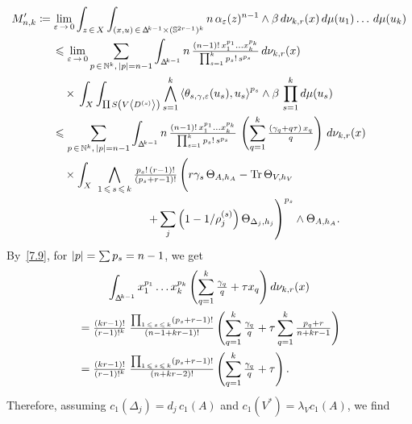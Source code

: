 \documentclass[AHL,Unicode,longabstracts,published]{cedram}
\DeclareMathOperator{\Tr}{Tr}
\DeclarePairedDelimiter{\abs}{\lvert}{\rvert}
\newcommand*\bN{\mathbb{N}}
\newcommand*\bS{\mathbb{S}}
\newcommand\bDel{\mbox{$\Delta$\newline \scalebox{.6}{\raisebox{3pt}{$\mkern-22mu\not{}\mkern12mu$}}}}
\newcommand\bDelta{\mathchoice{\bDel}{\bDel}{\scalebox{.7}{\bDel}}{\scalebox{.5}{\bDel}}}
\let\leq\leqslant
\newcommand*\bydef{\coloneqq}
\begin{document}
\break
\begin{multline*}
M'_{n,k} \bydef
\lim_{\varepsilon\,\to\,0}\int_{z\,\in\,X}
\int_{(x,u)\,\in\,\bDelta^{k-1}\times(\bS^{2r-1})^k} n\,\alpha_\varepsilon(z)^{n-1}\wedge\beta\, d\nu_{k,r}(x)\,d\mu(u_1)\ldots\,d\mu(u_k)\\
\begin{aligned}
&\leq\lim_{\varepsilon\,\to\,0}\sum_{p\,\in\,\bN^k,\,\abs{p}=n-1}\int_{\bDelta^{k-1}} n\,\tfrac{(n-1)!\,x_1^{p_1}\ldots x_k^{p_k}}{
\prod_{s=1}^kp_s!\,s^{p_s}}\,d\nu_{k,r}(x)\\
&\quad\times{}\int_X\int_{\raise-1pt\hbox{${\textstyle\Pi}$}\kern1pt S\left(V\left\langle D^{(s)}\right\rangle\right)}\bigwedge_{s=1}^k
\left\langle\theta_{s,\gamma,\varepsilon}(u_s),u_s\right\rangle^{p_s}\wedge\beta\,
\prod_{s=1}^kd\mu(u_s)\\
&\leq\sum_{p\,\in\,\bN^k,\,\abs{p}=n-1}\int_{\bDelta^{k-1}} n\,\tfrac{(n-1)!\,x_1^{p_1}\ldots x_k^{p_k}}{\prod_{s=1}^kp_s!\,s^{p_s}}\,
\left(\sum_{q=1}^k\tfrac{(\gamma_q+q\tau)\,x_q}{q}\right)\,d\nu_{k,r}(x)\\
&\quad \times \int_X~\bigwedge_{1\,\leq\,s\,\leq\,k}\tfrac{p_s!\,(r-1)!}{\left(p_s+r-1\right)!}\,
\Bigg(r\gamma_s\,\Theta_{A,h_A}-\Tr\Theta_{V,h_V}\\
&\mkern150mu \left.+\sum_j \left(1-1/\rho^{(s)}_j\right)\Theta_{\Delta_j,h_j}\right)^{p_s}\wedge\Theta_{A,h_A}.
\end{aligned}
\end{multline*}
By~\eqref{7.9}, for $\abs{p}=\sum p_s=n-1$, we get
\begin{multline*}
\int_{\bDelta^{k-1}}x_1^{p_1}\ldots x_k^{p_k}\left(\sum_{q=1}^k\tfrac{\gamma_q}{ q} +\tau x_q\right)d\nu_{k,r}(x)
\\
\begin{aligned}
&=
\tfrac{(kr-1)!}{ (r-1)!^k}\;
\tfrac{\prod_{1\,\leq\,s\,\leq\,k}\left(p_s+r-1\right)!}{(n-1+kr-1)!}
\left(\sum_{q=1}^k\tfrac{\gamma_q}{ q}+\tau\sum_{q=1}^k\tfrac{p_q+r}{ n+kr-1}\right)
\\
&=
\tfrac{(kr-1)!}{(r-1)!^k}\;
\tfrac{\prod_{1\,\leq\,s\,\leq\,k}\left(p_s+r-1\right)!}{(n+kr-2)!}
\left(\sum_{q=1}^k\tfrac{\gamma_q}{ q}+\tau\right).
\end{aligned}
\end{multline*}
Therefore, assuming $c_1(\Delta_j)=d_j\,c_1(A)$ and
$c_1(V^*)=\lambda_Vc_1(A)$, we find
\end{document}
